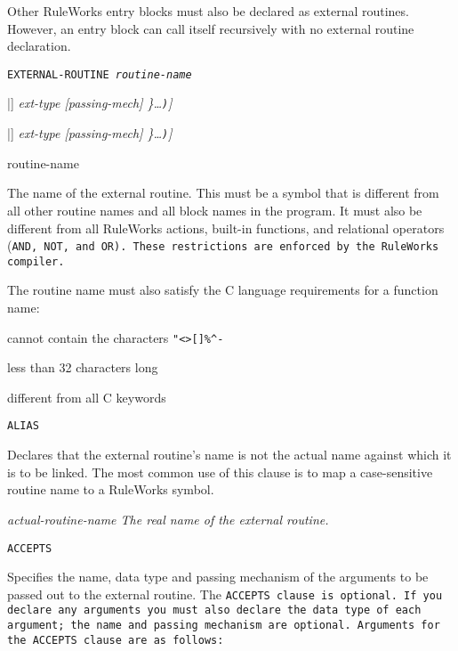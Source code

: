 Other RuleWorks entry blocks must also be declared as external
routines. However, an entry block can call itself recursively with no
external routine declaration.

\Format

\tt{EXTERNAL-ROUTINE} \it{routine-name}


\qquad[\tt{(ACCEPTS} \{ [\verb|<|\it{f-param-name}\verb|>|
[\verb|[|\it{size}\verb|]|] \it{ext-type} [\it{passing-mech}]
\}\ldots\verb|)|]

\qquad[\tt{(RETURNS} \{ [\verb|<|\it{f-param-name}\verb|>|
[\verb|[|\it{size}\verb|]|] \it{ext-type} [\it{passing-mech}]
\}\ldots\verb|)|]

\begin{arguments}
\item[routine-name]

  The name of the external routine. This must be a symbol that is
  different from all other routine names and all block names in the
  program. It must also be different from all RuleWorks actions,
  built-in functions, and relational operators (\tt{AND}, \tt{NOT},
  and \tt{OR}). These restrictions are enforced by the RuleWorks
  compiler.

  The routine name must also satisfy the C language requirements for a
  function name:

  \qquad cannot contain the characters \verb|"<>[]%^-|

  \qquad less than 32 characters long

  \qquad different from all C keywords
\end{arguments}

\Clauses

\tt{ALIAS}

Declares that the external routine's name is not the actual name
against which it is to be linked. The most common use of this clause
is to map a case-sensitive routine name to a RuleWorks symbol.

\it{actual-routine-name} The real name of the external routine.

\tt{ACCEPTS}

Specifies the name, data type and passing mechanism of the arguments
to be passed out to the external routine. The \tt{ACCEPTS} clause is
optional. If you declare any arguments you must also declare the data
type of each argument; the name and passing mechanism are
optional. Arguments for the \tt{ACCEPTS} clause are as follows:

